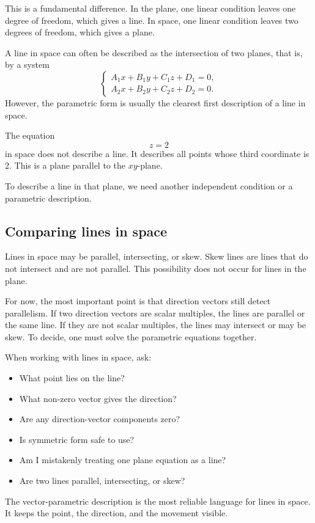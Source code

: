 This is a fundamental difference. In the plane, one linear condition leaves one degree of freedom, which gives a line. In space, one linear condition leaves two degrees of freedom, which gives a plane.

A line in space can often be described as the intersection of two planes, that is, by a system
\[
\begin{cases}
A_1x+B_1y+C_1z+D_1=0,\\
A_2x+B_2y+C_2z+D_2=0.
\end{cases}
\]
However, the parametric form is usually the clearest first description of a line in space.

\begin{examplebox}
The equation
\[
z=2
\]
in space does not describe a line. It describes all points whose third coordinate is \(2\). This is a plane parallel to the \(xy\)-plane.

To describe a line in that plane, we need another independent condition or a parametric description.
\end{examplebox}

\subsection*{Comparing lines in space}

Lines in space may be parallel, intersecting, or skew. Skew lines are lines that do not intersect and are not parallel. This possibility does not occur for lines in the plane.

For now, the most important point is that direction vectors still detect parallelism. If two direction vectors are scalar multiples, the lines are parallel or the same line. If they are not scalar multiples, the lines may intersect or may be skew. To decide, one must solve the parametric equations together.

\begin{summarybox}
When working with lines in space, ask:
\begin{itemize}
\item What point lies on the line?
\item What non-zero vector gives the direction?
\item Are any direction-vector components zero?
\item Is symmetric form safe to use?
\item Am I mistakenly treating one plane equation as a line?
\item Are two lines parallel, intersecting, or skew?
\end{itemize}
\end{summarybox}

The vector-parametric description is the most reliable language for lines in space. It keeps the point, the direction, and the movement visible.